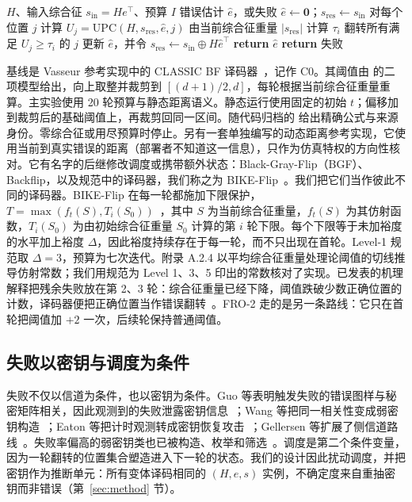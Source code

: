 \documentclass[UTF8,a4paper,10pt,twocolumn]{ctexart}
\begin{document}
\begin{algorithm}[t]
\caption{普通 BF 译码}
\label{alg:bf}
\begin{algorithmic}[1]
\Require $H$、输入综合征 $s_{\mathrm{in}}=He^{\top}$、预算 $I$
\Ensure 错误估计 $\hat e$，或失败
\State $\hat e \gets \mathbf{0}$；$s_{\mathrm{res}} \gets s_{\mathrm{in}}$
  \State 对每个位置 $j$ 计算 $U_j=\mathrm{UPC}(H,s_{\mathrm{res}},\hat e,j)$
  \State 由当前综合征重量 $|s_{\mathrm{res}}|$ 计算 $\tau_i$
  \State 翻转所有满足 $U_j\ge\tau_i$ 的 $j$
  \State 更新 $\hat e$，并令 $s_{\mathrm{res}}\gets s_{\mathrm{in}}\oplus H\hat e^{\top}$
    \State \textbf{return} $\hat e$
  \EndIf
\EndFor
\State \textbf{return} 失败
\end{algorithmic}
\end{algorithm}

基线是 Vasseur 参考实现中的 CLASSIC BF 译码器~\cite{vasseur2021thesis}，记作 C0。其阈值由  的二项模型给出，向上取整并裁剪到 $[(d+1)/2,d]$，每轮根据当前综合征重量重算。主实验使用 20 轮预算与静态距离语义。静态运行使用固定的初始 $t$；偏移加到裁剪后的基础阈值上，再裁剪回同一区间。随代码归档的  给出精确公式与来源身份。零综合征或用尽预算时停止。另有一套单独编写的动态距离参考实现，它使用当前到真实错误的距离（部署者不知道这一信息），只作为仿真特权的方向性核对。它有名字的后继修改调度或携带额外状态：Black-Gray-Flip（BGF）、Backflip，以及规范中的译码器，我们称之为 BIKE-Flip~\cite{drucker2020shades,vasseur2021thesis,bike2024spec}。我们把它们当作彼此不同的译码器。BIKE-Flip 在每一轮都施加下限保护，$T=\max(f_t(S),T_i(S_0))$~\cite{bike2024spec}，其中 $S$ 为当前综合征重量，$f_t(S)$ 为其仿射函数，$T_i(S_0)$ 为由初始综合征重量 $S_0$ 计算的第 $i$ 轮下限。每个下限等于未加裕度的水平加上裕度 $\Delta$，因此裕度持续存在于每一轮，而不只出现在首轮。Level-1 规范取 $\Delta=3$，预算为七次迭代。附录 A.2.4 以平均综合征重量处理论阈值的切线推导仿射常数；我们用规范为 Level 1、3、5 印出的常数核对了实现。已发表的机理解释把残余失败放在第 2、3 轮：综合征重量已经下降，阈值跌破少数正确位置的计数，译码器便把正确位置当作错误翻转~\cite{sendrier2024seminar,wang2023weak}。FRO-2 走的是另一条路线：它只在首轮把阈值加 $+2$ 一次，后续轮保持普通阈值。

\subsection{失败以密钥与调度为条件}

失败不仅以信道为条件，也以密钥为条件。Guo 等表明触发失败的错误图样与秘密矩阵相关，因此观测到的失败泄露密钥信息~\cite{guo2016key}；Wang 等把同一相关性变成弱密钥构造~\cite{wang2023weak}；Eaton 等把计时观测转成密钥恢复攻击~\cite{eaton2018timing}；Gellersen 等扩展了侧信道路线~\cite{gellersen2025}。失败率偏高的弱密钥类也已被构造、枚举和筛选~\cite{vasseur2021thesis,nosouhi2023weakkey,matthews2025combinatorial}。调度是第二个条件变量，因为一轮翻转的位置集合塑造进入下一轮的状态。我们的设计因此扰动调度，并把密钥作为推断单元：所有变体译码相同的 $(H,e,s)$ 实例，不确定度来自重抽密钥而非错误（第~\ref{sec:method} 节）。
\end{document}
